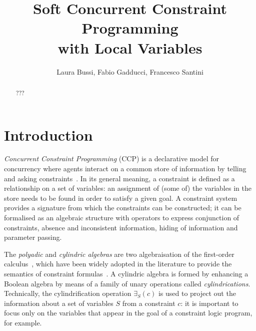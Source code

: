 \documentclass{llncs}
\begin{document}
\title{Soft Concurrent Constraint Programming\\ with Local Variables
}


\author{Laura Bussi, Fabio Gadducci, 
Francesco Santini
} 
	

\maketitle

\begin{abstract}
???
\end{abstract}


\section{Introduction}\label{sec:intro}
\emph{Concurrent Constraint Programming} (CCP) is a declarative model for concurrency where agents interact on a common store of information by telling and asking constraints~\cite{emerging}.  In its general meaning, a constraint is defined as a relationship on a set of variables: an assignment of (some of) the variables in the store needs to be found in order to satisfy a given goal.  A constraint system provides a signature from which the constraints can be constructed;  it can be formalised as an algebraic structure with operators to express conjunction of constraints, absence and inconsistent information, hiding of information and parameter passing.


The \emph{polyadic}  and  \emph{cylindric algebras} are two algebraisation of  the first-order calculus~\cite{cylalgebraic}, which have been widely  adopted in the literature to provide the semantics of constraint formulas~\cite{fgcs92,popl91}. A cylindric algebra is formed by enhancing a Boolean algebra by means of a family of unary operations called \emph{cylindrications}. Technically, the cylindrification operation $\exists_S(c)$ is used to project out the information about a set of variables $S$ from a constraint $c$: it is important to focus only on  the variables that appear in the goal of a constraint logic program, for example.
\end{document}
